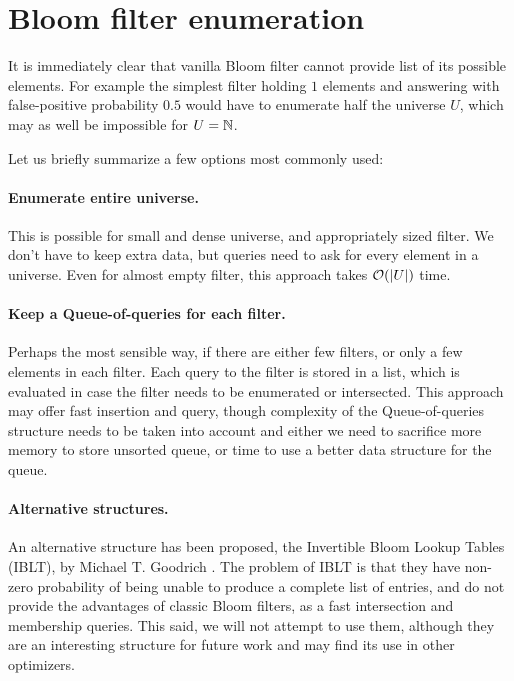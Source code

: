 \section{Bloom filter enumeration}

It is immediately clear that vanilla Bloom filter cannot provide list of its
possible elements. For example the simplest filter holding $1$ elements and
answering with false-positive probability $0.5$ would have to enumerate half the
universe $U$, which may as well be impossible for $U=\mathbb{N}$.

Let us briefly summarize a few options most commonly used:

\paragraph{Enumerate entire universe.} This is possible for small and dense
universe, and appropriately sized filter. We don't have to keep extra data, but
queries need to ask for every element in a universe. Even for almost empty
filter, this approach takes $\mathcal{O}(|U|)$ time.

\paragraph{Keep a Queue-of-queries for each filter.} Perhaps the most sensible
way, if there are either few filters, or only a few elements in each filter.
Each query to the filter is stored in a list, which is evaluated in case the
filter needs to be enumerated or intersected. This approach may offer fast
insertion and query, though complexity of the Queue-of-queries structure needs
to be taken into account and either we need to sacrifice more memory to store
unsorted queue, or time to use a better data structure for the queue.

\paragraph{Alternative structures.} An alternative structure has been proposed,
the Invertible Bloom
Lookup Tables (IBLT), by Michael T. Goodrich \cite{goodrich:2011}. The problem of IBLT is
that they have non-zero probability of being unable to produce a complete list
of entries, and do not provide the advantages of classic Bloom filters, as a
fast intersection and membership queries. This said, we will not attempt to use
them, although they are an interesting structure for future work and may find
its use in other optimizers.

